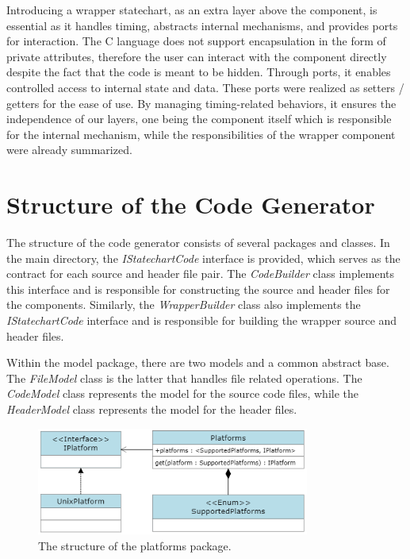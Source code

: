 Introducing a wrapper statechart, as an extra layer above the component, is essential as it handles timing, abstracts internal mechanisms, and provides ports for interaction. The C language does not support encapsulation in the form of private attributes, therefore the user can interact with the component directly despite the fact that the code is meant to be hidden. Through ports, it enables controlled access to internal state and data. These ports were realized as setters / getters for the ease of use. By managing timing-related behaviors, it ensures the independence of our layers, one being the component itself which is responsible for the internal mechanism, while the responsibilities of the wrapper component were already summarized.

\section{Structure of the Code Generator}

The structure of the code generator consists of several packages and classes. In the main directory, the \textit{IStatechartCode} interface is provided, which serves as the contract for each source and header file pair. The \textit{CodeBuilder} class implements this interface and is responsible for constructing the source and header files for the components. Similarly, the \textit{WrapperBuilder} class also implements the \textit{IStatechartCode} interface and is responsible for building the wrapper source and header files.

Within the model package, there are two models and a common abstract base. The \textit{FileModel} class is the latter that handles file related operations. The \textit{CodeModel} class represents the model for the source code files, while the \textit{HeaderModel} class represents the model for the header files.

\begin{figure}[h]
	\centering
	\includegraphics[width=0.8\textwidth]{images/platforms.png}
	\caption{The structure of the platforms package.}
	\label{fig:timing}
\end{figure}

